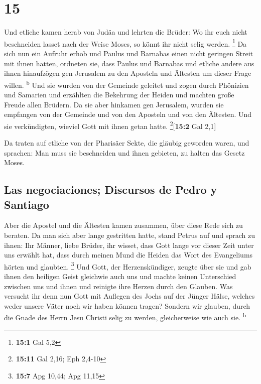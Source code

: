 \hypertarget{section-14}{%
\section{15}\label{section-14}}

 Und etliche kamen herab von Judäa und lehrten die Brüder:
Wo ihr euch nicht beschneiden lasset nach der Weise Moses, so könnt ihr
nicht selig werden. \footnote{\textbf{15:1} Gal 5,2}  Da
sich nun ein Aufruhr erhob und Paulus und Barnabas einen nicht geringen
Streit mit ihnen hatten, ordneten sie, dass Paulus und Barnabas und
etliche andere aus ihnen hinaufzögen gen Jerusalem zu den Aposteln und
Ältesten um dieser Frage willen. \textsuperscript{b}  Und
sie wurden von der Gemeinde geleitet und zogen durch Phönizien und
Samarien und erzählten die Bekehrung der Heiden und machten große Freude
allen Brüdern.  Da sie aber hinkamen gen Jerusalem, wurden
sie empfangen von der Gemeinde und von den Aposteln und von den
Ältesten. Und sie verkündigten, wieviel Gott mit ihnen getan hatte.
\footnote{\textbf{15:11} Gal 2,16; Eph 2,4-10}{[}\textbf{15:2} Gal
2,1{]}

 Da traten auf etliche von der Pharisäer Sekte, die
gläubig geworden waren, und sprachen: Man muss sie beschneiden und ihnen
gebieten, zu halten das Gesetz Moses.

\hypertarget{las-negociaciones-discursos-de-pedro-y-santiago}{%
\subsection{Las negociaciones; Discursos de Pedro y
Santiago}\label{las-negociaciones-discursos-de-pedro-y-santiago}}

 Aber die Apostel und die Ältesten kamen zusammen, über
diese Rede sich zu beraten.  Da man sich aber lange
gestritten hatte, stand Petrus auf und sprach zu ihnen: Ihr Männer,
liebe Brüder, ihr wisset, dass Gott lange vor dieser Zeit unter uns
erwählt hat, dass durch meinen Mund die Heiden das Wort des Evangeliums
hörten und glaubten. \footnote{\textbf{15:7} Apg 10,44; Apg 11,15}
 Und Gott, der Herzenskündiger, zeugte über sie und gab
ihnen den heiligen Geist gleichwie auch uns  und machte
keinen Unterschied zwischen uns und ihnen und reinigte ihre Herzen durch
den Glauben.  Was versucht ihr denn nun Gott mit Auflegen
des Jochs auf der Jünger Hälse, welches weder unsere Väter noch wir
haben können tragen?  Sondern wir glauben, durch die
Gnade des Herrn Jesu Christi selig zu werden, gleicherweise wie auch
sie. \textsuperscript{b}

